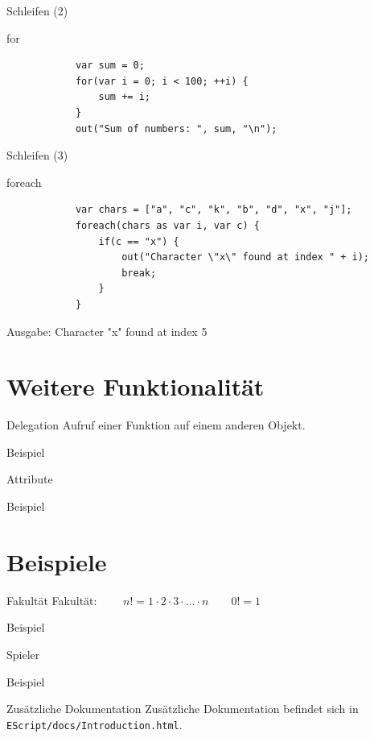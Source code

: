 \documentclass[ucs,9pt]{beamer}
\begin{document}
\begin{frame}[fragile]{Schleifen (2)}
	\begin{block}{for}
		\begin{lstlisting}
			var sum = 0;
			for(var i = 0; i < 100; ++i) {
			    sum += i;
			}
			out("Sum of numbers: ", sum, "\n");
		\end{lstlisting}
	\end{block}
\end{frame}

\begin{frame}[fragile]{Schleifen (3)}
	\begin{block}{foreach}
		\begin{lstlisting}
			var chars = ["a", "c", "k", "b", "d", "x", "j"];
			foreach(chars as var i, var c) {
			    if(c == "x") {
			        out("Character \"x\" found at index " + i);
			        break;
			    }
			}
		\end{lstlisting}
	\end{block}
	Ausgabe: Character "x"{} found at index 5
\end{frame}

\section{Weitere Funktionalität}
\begin{frame}{Delegation}
	Aufruf einer Funktion auf einem anderen Objekt.
	\begin{block}{Beispiel}
		
	\end{block}
\end{frame}

\begin{frame}{Attribute}
	\begin{block}{Beispiel}
		
	\end{block}
\end{frame}

\section{Beispiele}
\begin{frame}{Fakultät}
	Fakultät: $\qquad n! = 1 \cdot 2 \cdot 3 \cdot \ldots \cdot n \qquad 0! = 1$
	\begin{block}{Beispiel}
		
	\end{block}
\end{frame}

\begin{frame}{Spieler}
	\begin{block}{Beispiel}
		
	\end{block}
\end{frame}

\begin{frame}{Zusätzliche Dokumentation}
	Zusätzliche Dokumentation befindet sich in \texttt{EScript/docs/Introduction.html}.
\end{frame}
\end{document}
